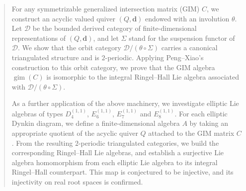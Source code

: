 \documentclass[12pt,reqno]{amsart}
\numberwithin{equation}{section}
\begin{document}
	\begin{abstract}
		
		For any symmetrizable generalized intersection matrix (GIM) $C$, we construct an acyclic valued quiver $(Q,\mathbf{d})$ endowed with an involution $\theta$. Let $\mathcal{D}$ be the bounded derived category of finite-dimensional representations of $(Q,\mathbf{d})$, and let $\Sigma$ stand for the suspension functor of $\mathcal{D}$. We show that the orbit category $\mathcal{D}/(\theta\circ\Sigma)$ carries a canonical triangulated structure and is $2$-periodic. Applying Peng--Xiao's construction to this orbit category, we prove that the GIM algebra $\operatorname{gim}(C)$ is isomorphic to the integral Ringel--Hall Lie algebra associated with $\mathcal{D}/(\theta\circ\Sigma)$.
		
		As a further application of the above machinery, we investigate elliptic Lie algebras of types $D_4^{(1,1)}$, $E_6^{(1,1)}$, $E_7^{(1,1)}$ and $E_8^{(1,1)}$. For each elliptic Dynkin diagram, we define a finite-dimensional algebra $A$ by taking an appropriate quotient of the acyclic quiver $Q$ attached to the GIM matrix $C$. From the resulting $2$-periodic triangulated categories, we build the corresponding Ringel--Hall Lie algebras, and establish a surjective Lie algebra homomorphism from each elliptic Lie algebra to its integral Ringel--Hall counterpart. This map is conjectured to be injective, and its injectivity on real root spaces is confirmed.
		
		
	\end{abstract}
	
	
	\maketitle
	
\end{document}
